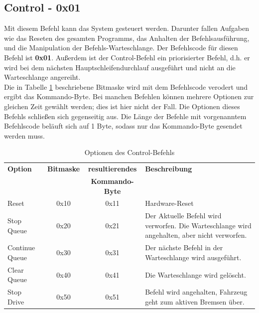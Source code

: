 \subsection{Control - 0x01}
Mit diesem Befehl kann das System gesteuert werden. Darunter fallen Aufgaben wie das
Reseten des gesamten Programms, das Anhalten der Befehlsausführung, und die Manipulation
der Befehls-Warteschlange. Der Befehlscode für diesen Befehl ist \textbf{0x01}. Außerdem ist der Control-Befehl
ein priorisierter Befehl, d.h. er wird bei dem nächsten Hauptschleifendurchlauf ausgeführt und nicht
an die Warteschlange angereiht.\\
Die in Tabelle \ref{protocol_control} beschriebene Bitmaske wird mit dem Befehlscode verodert
und ergibt das Kommando-Byte. Bei manchen Befehlen können mehrere Optionen zur gleichen Zeit
gewählt werden; dies ist hier nicht der Fall. Die Optionen dieses Befehls schließen sich
gegenseitig aus. Die Länge der Befehle mit vorgenanntem Befehlscode beläuft sich auf 1 Byte, sodass
 nur das Kommando-Byte gesendet werden muss.
\begin{table}[htb]
\begin{center}
	\begin{tabularx}{\linewidth}{|l|c|c|X|}
		\hline
		\textbf{Option} & \textbf{Bitmaske} & \textbf{resultierendes} & \textbf{Beschreibung} \\
		                &                   & \textbf{Kommando-Byte}   & \\
		\hline
		\hline
		Reset 			& 0x10 				& 0x11                    & Hardware-Reset \\
		\hline
		Stop Queue		& 0x20				& 0x21                    & Der Aktuelle Befehl wird verworfen. Die Warteschlange wird angehalten, aber nicht verworfen. \\
		\hline
		Continue Queue	& 0x30				& 0x31                    & Der nächste Befehl in der Warteschlange wird ausgeführt. \\
		\hline
		Clear Queue		& 0x40				& 0x41                    & Die Warteschlange wird gelöscht. \\
		\hline
		Stop Drive		& 0x50				& 0x51                    &Befehl wird angehalten, Fahrzeug geht zum aktiven Bremsen über. \\
		\hline
	\end{tabularx}
	\caption{\label{protocol_control} Optionen des Control-Befehls}
\end{center}
\end{table}

